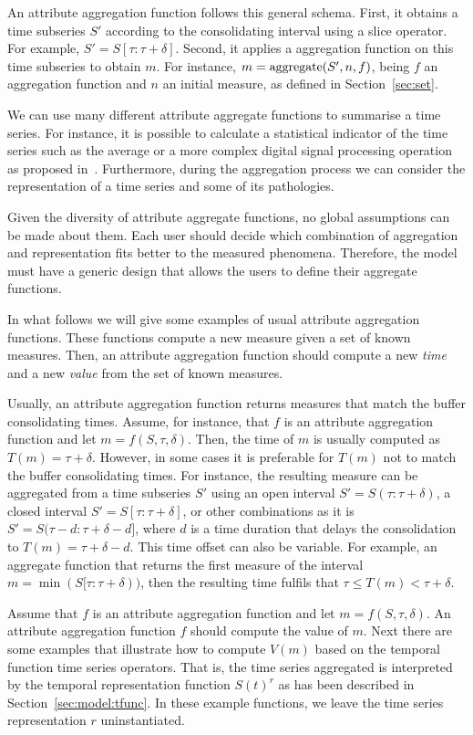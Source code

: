 An attribute aggregation function follows this general schema. First,
it obtains a time subseries $S'$ according to the consolidating
interval using a slice operator. For example, $S' =
S[\tau:\tau+\delta]$. Second, it applies a  aggregation
function on this time subseries to obtain $m$. For instance, $m =
\operatorname*{aggregate}(S',n, f)$, being $f$ an aggregation function and $n$ an initial
measure, as defined in Section~\ref{sec:set}.

We can use many different attribute aggregate functions to summarise a
time series. For instance, it is possible to calculate a statistical
indicator of the time series such as the average or a more complex
digital signal processing operation as proposed
in~\cite{zhang11}. Furthermore, during the aggregation process we can
consider the representation of a time series and some of its
pathologies.

Given the diversity of attribute aggregate functions, no global
assumptions can be made about them. Each user should decide which
combination of aggregation and representation fits better to the
measured phenomena.  Therefore, the  model must have a
generic design that allows the users to define their aggregate
functions.

In what follows we will give some examples of usual attribute
aggregation functions. These functions compute a new measure given a
set of known measures. Then, an attribute aggregation function should
compute a new \emph{time} and a new \emph{value} from the set of known
measures.

Usually, an attribute aggregation function returns measures that match
the buffer consolidating times. Assume, for instance, that $f$ is an
attribute aggregation function and let $m=f(S,\tau,\delta)$.  Then,
the time of $m$ is usually computed as $T(m)=\tau+\delta$.  However,
in some cases it is preferable for $T(m)$ not to match the buffer
consolidating times. For instance, the resulting measure can be
aggregated from a time subseries $S'$ using an open interval
$S'=S(\tau:\tau+\delta)$, a closed interval $S'=S[\tau:\tau+\delta]$,
or other combinations as it is $S'=S(\tau-d:\tau+\delta-d]$, where $d$
is a time duration that delays the consolidation to
$T(m)=\tau+\delta-d$.  This time offset can also be variable. For
example, an aggregate function that returns the first measure of the
interval $m=\min(S[\tau:\tau+\delta))$, then the resulting time
fulfils that $\tau\leq T(m) < \tau+\delta$.

Assume that $f$ is an attribute aggregation function and let
$m=f(S,\tau,\delta)$.  An attribute aggregation function $f$ should
compute the value of $m$. Next there are some examples that illustrate
how to compute $V(m)$ based on the temporal function time series
operators.  That is, the time series aggregated is interpreted by the
temporal representation function $S(t)^r$ as has been described in
Section~\ref{sec:model:tfunc}. In these example functions, we leave
the time series representation $r$ uninstantiated.

